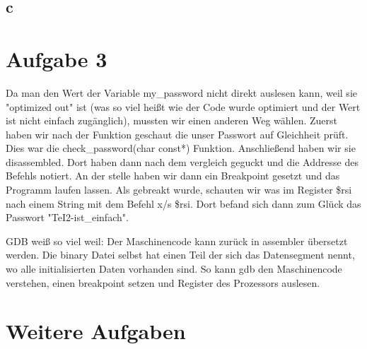\documentclass{ti2}
\begin{document}
\subsection{c}

\section{Aufgabe 3}

Da man den Wert der Variable my\_password nicht direkt auslesen kann, weil sie "optimized out" ist
(was so viel heißt wie der Code wurde optimiert und der Wert ist nicht einfach zugänglich), 
mussten wir einen anderen Weg wählen. 
Zuerst haben wir nach der Funktion geschaut die unser Passwort auf Gleichheit prüft.
Dies war die check\_password(char const*) Funktion. Anschließend haben wir sie disassembled.
Dort haben dann nach dem vergleich geguckt und die Addresse des Befehls notiert.
An der stelle haben wir dann ein Breakpoint gesetzt und das Programm laufen lassen.
Als gebreakt wurde, schauten wir was im Register \$rsi nach einem String mit dem Befehl 
x/s \$rsi. Dort befand sich dann zum Glück das Passwort "TeI2-ist\_einfach". 

GDB weiß so viel weil:
Der Maschinencode kann zurück in assembler übersetzt werden.
Die binary Datei selbst hat einen Teil der sich das Datensegment nennt, wo alle initialisierten Daten vorhanden sind. 
So kann gdb den Maschinencode verstehen, einen breakpoint setzen und Register des Prozessors auslesen. 

\section{Weitere Aufgaben}
\end{document}
